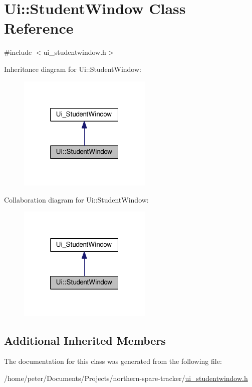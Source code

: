 \hypertarget{class_ui_1_1_student_window}{}\section{Ui\+:\+:Student\+Window Class Reference}
\label{class_ui_1_1_student_window}


{\ttfamily \#include $<$ui\+\_\+studentwindow.\+h$>$}



Inheritance diagram for Ui\+:\+:Student\+Window\+:
\nopagebreak
\begin{figure}[H]
\begin{center}
\leavevmode
\includegraphics[width=181pt]{class_ui_1_1_student_window__inherit__graph}
\end{center}
\end{figure}


Collaboration diagram for Ui\+:\+:Student\+Window\+:
\nopagebreak
\begin{figure}[H]
\begin{center}
\leavevmode
\includegraphics[width=181pt]{class_ui_1_1_student_window__coll__graph}
\end{center}
\end{figure}
\subsection*{Additional Inherited Members}


The documentation for this class was generated from the following file\+:\begin{DoxyCompactItemize}
\item 
/home/peter/\+Documents/\+Projects/northern-\/spare-\/tracker/\hyperlink{ui__studentwindow_8h}{ui\+\_\+studentwindow.\+h}\end{DoxyCompactItemize}
